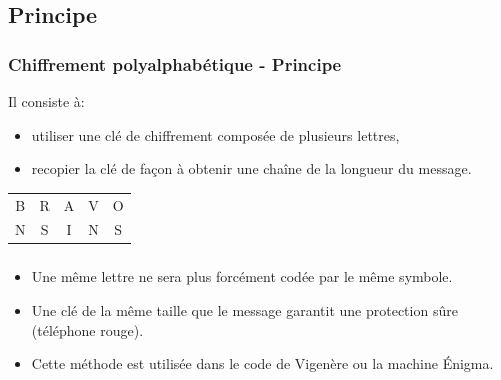 \documentclass[svgnames,11pt]{beamer}
\begin{document}
\subsection{Principe}
\begin{frame}
    \frametitle{Chiffrement polyalphabétique - Principe}
Il consiste à:
    \begin{itemize}
        \item utiliser une clé de chiffrement composée de plusieurs lettres,
        \item recopier la clé de façon à obtenir une chaîne de la longueur du message.
    \end{itemize}
\begin{center}
    \begin{tabular}{*{5}{c}}
        B&R&A&V&O\\
        N&S&I&N&S\\
    \end{tabular}
\end{center}


\end{frame}
\begin{frame}
    \frametitle{}
    \begin{center}
        \begin{aretenir}[Remarques:]
            \begin{itemize}
                \item<1-> Une même lettre ne sera plus forcément codée par le même symbole.
                \item<2-> Une clé de la même taille que le message garantit une protection sûre (téléphone rouge). 
                \item<3-> Cette méthode est utilisée dans le code de Vigenère ou la machine Énigma.
            \end{itemize}
        \end{aretenir}
        \end{center}
    

\end{frame}
\end{document}
